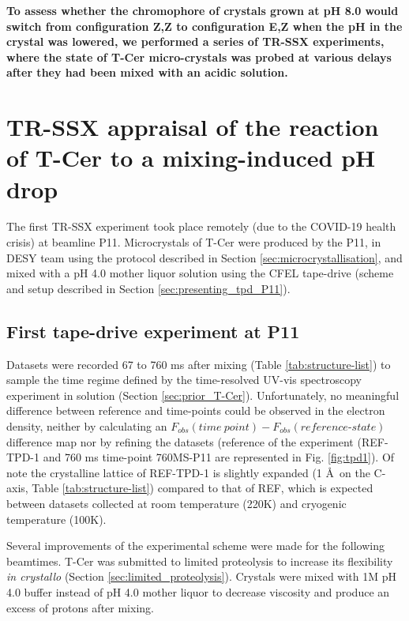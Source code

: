 \textbf{To assess whether the chromophore of crystals grown at pH 8.0 would switch from configuration Z,Z to configuration E,Z when the pH in the crystal was lowered, we performed a series of TR-SSX experiments, where the state of T-Cer micro-crystals was probed at various delays after they had been mixed with an acidic solution. }

\section{TR-SSX appraisal of the reaction of T-Cer to a mixing-induced pH drop}

The first TR-SSX experiment took place remotely (due to the COVID-19 health crisis) at beamline P11. Microcrystals of T-Cer were produced by the P11, in DESY team using the protocol described in Section \ref{sec:microcrystallisation}, and mixed with a pH 4.0 mother liquor solution using the CFEL tape-drive \parencite{beyerleinMixanddiffuseSerialSynchrotron2017, zielinskiRapidEfficientRoomtemperature2022} (scheme and setup described in Section \ref{sec:presenting_tpd_P11}). 

\subsection{First tape-drive experiment at P11}

Datasets were recorded 67 to 760 ms after mixing (Table \ref{tab:structure-list}) to sample the time regime defined by the time-resolved UV-vis spectroscopy experiment in solution (Section \ref{sec:prior_T-Cer}). Unfortunately, no meaningful difference between reference and time-points could be observed in the electron density, neither by calculating an \(F_{obs}(time\ point) - F_{obs}(reference\mbox{-}state)\) difference map nor by refining the datasets (reference of the experiment (REF-TPD-1 and 760 ms time-point 760MS-P11 are represented in Fig. \ref{fig:tpd1}). Of note the crystalline lattice of REF-TPD-1 is slightly expanded (1 \AA\ on the C-axis, Table \ref{tab:structure-list}) compared to that of REF, which is expected between datasets collected at room temperature (220K) and cryogenic temperature (100K). 

\vspace{2mm}

Several improvements of the experimental scheme were made for the following beamtimes. T-Cer was submitted to limited proteolysis to increase its flexibility \textit{in crystallo} (Section \ref{sec:limited_proteolysis}). Crystals were mixed with 1M pH 4.0 buffer instead of pH 4.0 mother liquor to decrease viscosity and produce an excess of protons after mixing. 


